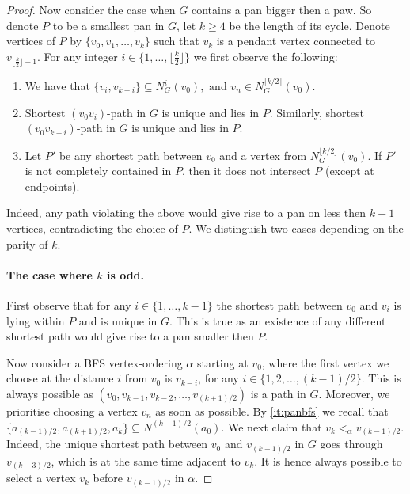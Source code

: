 \documentclass{svproc}
\begin{document}
\begin{proof}
Now consider the case when $G$ contains a pan bigger then a paw. So denote $P$ to be a smallest pan in $G$, let $k\ge 4$ be the length of its cycle. Denote vertices of $P$ by $\{v_0,v_1,\dots,v_k\}$ such that $v_k$ is a pendant vertex connected to $v_{\lfloor \frac{k}{2}\rfloor-1}$. 
For any integer $i\in \{1,\dots,\lfloor \frac{k}{2}\rfloor\}$ we first observe the following:
\begin{enumerate}
    \item We have that $\{v_i,v_{k-i}\}\subseteq N_G^i(v_0),\text{ and }v_n\in N_G^{\lfloor k/2\rfloor}(v_0)$.\label{it:panbfs}
    \item Shortest $(v_0v_i)$-path in $G$ is unique and lies in $P$. Similarly, shortest $(v_0v_{k-i})$-path in $G$ is unique and lies in $P$.\label{it:bfs-unique}
    \item Let $P'$ be any shortest path between $v_0$ and a vertex from $N_G^{\lfloor k/2\rfloor}(v_0)$. If $P'$ is not completely contained in $P$, then it does not intersect $P$ (except at endpoints).\label{it:short}
\end{enumerate}

Indeed, any path violating the above would give rise to a pan on less then $k+1$ vertices, contradicting the choice of $P$. 
We distinguish two cases depending on the parity of $k$.


\paragraph{The case where $k$ is odd.}
First observe that for any $i\in \{1,\dots,k-1\}$
the shortest path between $v_0$ and $v_i$ is lying within $P$ and is unique in $G$. 
This is true as an existence of any different shortest path would give rise to a pan smaller then $P$.

Now consider a BFS vertex-ordering $\alpha$ starting at $v_0$, where the first vertex we choose at the distance $i$ from $v_0$ is 
$v_{k-i}$, for any $i\in \{1,2,\dots, (k-1)/2\}$. 
This is always possible as $(v_0,v_{k-1},v_{k-2},\dots,v_{(k+1)/2})$ is a path in $G$.
Moreover, we prioritise choosing a vertex $v_n$ as soon as possible.
By \cref{it:panbfs} we recall that
$\{a_{(k-1)/2},a_{(k+1)/2},a_k\}\subseteq N^{(k-1)/2}(a_0)$.
We next claim that $v_k<_{\alpha}v_{(k-1)/2}$. 
Indeed, the unique shortest path between $v_0$ and $v_{(k-1)/2}$ in $G$ goes through $v_{(k-3)/2}$, which is at the same time adjacent to $v_k$. It is hence always possible to select a vertex $v_k$ before $v_{(k-1)/2}$ in $\alpha$.


\end{proof}
\end{document}
